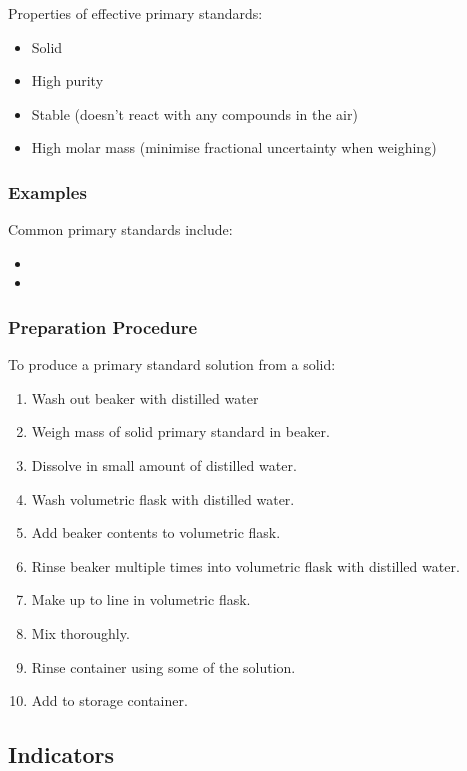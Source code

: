 \documentclass[a4paper,11pt]{article}
\begin{document}
Properties of effective primary standards:

\begin{itemize}
\item Solid
\item High purity
\item Stable (doesn't react with any compounds in the air)
\item High molar mass (minimise fractional uncertainty when weighing)
\end{itemize}


\subsubsection{Examples}

Common primary standards include:

\begin{itemize}
\item {}
\item {}
\end{itemize}


\subsubsection{Preparation Procedure}

To produce a primary standard solution from a solid:

\begin{enumerate}
\item Wash out beaker with distilled water
\item Weigh mass of solid primary standard in beaker.
\item Dissolve in small amount of distilled water.
\item Wash volumetric flask with distilled water.
\item Add beaker contents to volumetric flask.
\item Rinse beaker multiple times into volumetric flask with distilled water.
\item Make up to line in volumetric flask.
\item Mix thoroughly.
\item Rinse container using some of the solution.
\item Add to storage container.
\end{enumerate}


\subsection{Indicators}
\end{document}
